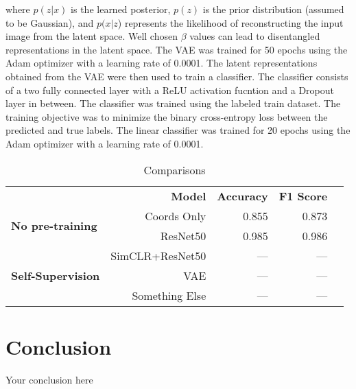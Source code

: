\documentclass{article}
\begin{document}
where $p(z|x)$ is the learned posterior, $p(z)$ is the prior distribution (assumed to be Gaussian), and $p(x|z$) represents the likelihood of reconstructing the input image from the latent space. Well chosen $\beta$ values can lead to disentangled representations in the latent space. The VAE was trained for 50 epochs using the Adam optimizer with a learning rate of 0.0001. The latent representations obtained from the VAE were then used to train a classifier. The classifier consists of a two fully connected layer with a ReLU activation fucntion and a Dropout layer in between. The classifier was trained using the labeled train dataset. The training objective was to minimize the binary cross-entropy loss between the predicted and true labels. The linear classifier was trained for 20 epochs using the Adam optimizer with a learning rate of 0.0001.


\begin{table}[!htp]\centering
  \caption{Comparisons}\label{tab: }
  \scriptsize
  \begin{tabular}{lrrrr}\toprule
                                               & \textbf{Model}  & \textbf{Accuracy} & \textbf{F1 Score} \\\cmidrule{2-4}
    \multirow{2}{*}{\textbf{No pre-training}}  & Coords Only     & 0.855             & 0.873             \\ %
                                               & ResNet50        & 0.985             & 0.986             \\\cmidrule{1-4}
    \multirow{3}{*}{\textbf{Self-Supervision}} & SimCLR+ResNet50 & ---               & ---               \\ %
                                               & VAE             & ---               & ---               \\ %
                                               & Something Else  & ---               & ---               \\\midrule
    \bottomrule
  \end{tabular}
\end{table}

\section{Conclusion}
Your conclusion here



\end{document}

